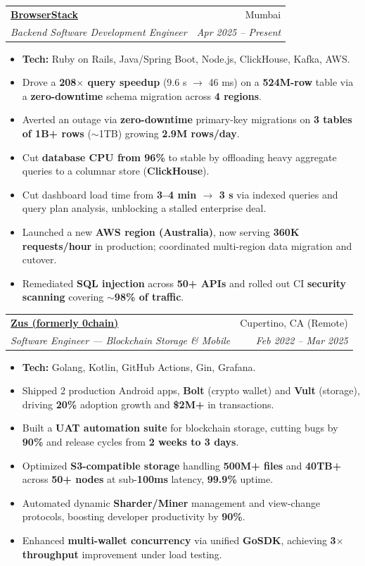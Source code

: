 \documentclass[letterpaper,10pt]{article}
\makeatletter
\newcommand{\resumeItem}[1]{
  \item\small{
    #1 \vspace{-2pt}
  }
}
\newcommand{\resumeSubheading}[4]{
  \item
    \begin{tabular*}{0.97\textwidth}{l@{\extracolsep{\fill}}r}
      \textbf{#1} & #2 \\
      \textit{\small#3} & \textit{\small #4} \\
    \end{tabular*}
}
\newcommand{\resumeItemListStart}{\vspace{1pt}\begin{itemize}[leftmargin=8pt,itemsep=3pt,parsep=0pt]
  \selectfont\small
  \setlength\itemsep{3pt}
  \setlength\parsep{0em}
  }
\newcommand{\resumeItemListEnd}{\end{itemize}}
\makeatother
\begin{document}
\resumeSubheading
{\href{https://browserstack.com}{BrowserStack}}{Mumbai}
{Backend Software Development Engineer}{Apr 2025 -- Present}
\resumeItemListStart
\resumeItem{\textbf{Tech:} Ruby on Rails, Java/Spring Boot, Node.js, ClickHouse, Kafka, AWS.}
\resumeItem{Drove a \textbf{208$\times$ query speedup} (9.6 s $\rightarrow$ 46 ms) on a \textbf{524M-row} table via a \textbf{zero-downtime} schema migration across \textbf{4 regions}.}
\resumeItem{Averted an outage via \textbf{zero-downtime} primary-key migrations on \textbf{3 tables of 1B+ rows} ($\sim$1TB) growing \textbf{2.9M rows/day}.}
\resumeItem{Cut \textbf{database CPU from 96\%} to stable by offloading heavy aggregate queries to a columnar store (\textbf{ClickHouse}).}
\resumeItem{Cut dashboard load time from \textbf{3--4 min $\rightarrow$ 3 s} via indexed queries and query plan analysis, unblocking a stalled enterprise deal.}
\resumeItem{Launched a new \textbf{AWS region (Australia)}, now serving \textbf{360K requests/hour} in production; coordinated multi-region data migration and cutover.}
\resumeItem{Remediated \textbf{SQL injection} across \textbf{50+ APIs} and rolled out CI \textbf{security scanning} covering \textbf{$\sim$98\% of traffic}.}
\resumeItemListEnd

\resumeSubheading
{\href{https://0chain.net}{Zus (formerly 0chain)}}{Cupertino, CA (Remote)}
{Software Engineer --- Blockchain Storage \& Mobile}{Feb 2022 -- Mar 2025}
\resumeItemListStart
\resumeItem{\textbf{Tech:} Golang, Kotlin, GitHub Actions, Gin, Grafana.}
\resumeItem{Shipped 2 production Android apps, \textbf{Bolt} (crypto wallet) and \textbf{Vult} (storage), driving \textbf{20\%} adoption growth and \textbf{\$2M+} in transactions.}
\resumeItem{Built a \textbf{UAT automation suite} for blockchain storage, cutting bugs by \textbf{90\%} and release cycles from \textbf{2 weeks to 3 days}.}
\resumeItem{Optimized \textbf{S3-compatible storage} handling \textbf{500M+ files} and \textbf{40TB+} across \textbf{50+ nodes} at sub-\textbf{100ms} latency, \textbf{99.9\%} uptime.}
\resumeItem{Automated dynamic \textbf{Sharder/Miner} management and view-change protocols, boosting developer productivity by \textbf{90\%}.}
\resumeItem{Enhanced \textbf{multi-wallet concurrency} via unified \textbf{GoSDK}, achieving \textbf{3$\times$ throughput} improvement under load testing.}
\resumeItemListEnd
\end{document}
